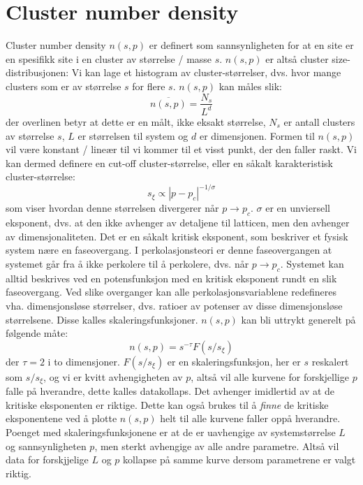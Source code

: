 \documentclass[english, a4paper]{article}
\begin{document}
\section{Cluster number density}
Cluster number density $n(s,p)$ er definert som sannsynligheten for at en site er en spesifikk
site i en cluster av størrelse / masse $s$. $n(s,p)$ er altså cluster size-distribusjonen: Vi kan 
lage et histogram av cluster-størrelser, dvs. hvor mange clusters som er av størrelse $s$ for flere $s$.
$n(s,p)$ kan måles slik:
\begin{equation}
 \overline{n(s,p)} = \frac{N_s}{L^d}
\end{equation}
der overlinen betyr at dette er en målt, ikke eksakt størrelse, $N_s$ er antall clusters av størrelse $s$, 
$L$ er størrelsen til system og $d$ er dimensjonen. Formen til $n(s,p)$ vil være konstant / lineær til vi kommer til
et visst punkt, der den faller raskt. Vi kan dermed definere en cut-off cluster-størrelse, eller en såkalt
karakteristisk cluster-størrelse:
\begin{equation}
 s_\xi \propto |p - p_c|^{-1/\sigma}
\end{equation}
som viser hvordan denne størrelsen divergerer når $p \to p_c$. $\sigma$ er en unviersell eksponent, dvs.
at den ikke avhenger av detaljene til latticen, men den avhenger av dimensjonaliteten. 
Det er en såkalt kritisk eksponent, som beskriver et fysisk system nære en faseovergang. 
I perkolasjonsteori er denne faseovergangen at systemet går fra å ikke perkolere til å perkolere, dvs.
når $p \to p_c$. Systemet kan alltid beskrives ved en potensfunksjon med en kritisk eksponent
rundt en slik faseovergang. Ved slike overganger kan alle perkolasjonsvariablene redefineres vha.
dimensjonsløse størrelser, dvs. ratioer av potenser av disse dimensjonsløse størrelsene. 
Disse kalles skaleringsfunksjoner. 
$n(s,p)$ kan bli uttrykt generelt på følgende måte:
\begin{equation}
 n(s,p) = s^{-\tau}F(s/s_{\xi})
 \label{generalNumberDensity}
\end{equation}
der $\tau = 2$ i to dimensjoner. $F(s/s_{\xi})$ er en skaleringsfunksjon, her er $s$ reskalert som
$s/s_\xi$, og vi er kvitt avhengigheten av $p$, altså vil alle kurvene for forskjellige
$p$ falle på hverandre, dette kalles datakollaps. Det avhenger imidlertid av at de kritiske eksponenten er 
riktige. Dette kan også brukes til å \textit{finne} de kritiske eksponentene ved å plotte $n(s,p)$
helt til alle kurvene faller oppå hverandre. Poenget med skaleringsfunksjonene er at de er uavhengige av
systemstørrelse $L$ og sannsynligheten $p$, men sterkt avhengige av alle andre parametre. Altså vil 
data for forskjjelige $L$ og $p$ kollapse på samme kurve dersom parametrene er valgt riktig. 
\end{document}
